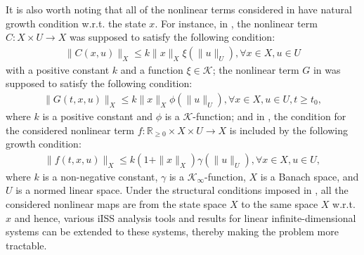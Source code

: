 \documentclass[onecolumn]{autart}
\newenvironment{proof of Prop.ODE}{{\it Proof of Proposition~\ref{Prop.ODE}:\enspace}}{\hfill $\blacksquare$\par}
\newenvironment{proof of PDE}{{\it Proof of Proposition \ref{Prop.8}:\enspace}}{\hfill $\blacksquare$\par}
\begin{document}
It is also worth noting that  all of  the nonlinear terms considered in {\cite{mironchenko2016MCRF,mironchenko2020SIAM,Hosfeld2022,damak2021input,damak2023input,Heni:2025,JoseL2023}} have    natural growth condition  { w.r.t. } the state $x$. For instance, in \cite{mironchenko2016MCRF}, the nonlinear term $C: X \times U \to X$ was supposed to satisfy the following condition:
\begin{align*}
	\|C(x, u)\|_X \leq k\|x\|_X   \xi(\|u\|_U),   \forall x \in X, u \in U
\end{align*}
with a positive constant $k$ and a function $\xi \in \mathcal{K}$;   the nonlinear term $G$ in {\cite{damak2021input,Heni:2025}} was supposed to satisfy the following condition:
\begin{align*}
	{\|G(t,x,u)\|_X}\leq k \|x\|_X \phi(\|u\|_U),{\forall x\in X,u\in U,t\geq t_0,}
\end{align*}
where $k$ is a positive constant and $\phi$ is a  {$\mathcal{K}$-function}; and in \cite{JoseL2023},   the condition for the considered nonlinear term $f:\mathbb{R}_{\geq 0}\times X \times U \rightarrow X$   is included by the following    growth condition:
\begin{align*}
	\|f(t,x,u)\|_{{X}}\leq k(1+  \|x\|_{{X}} )\gamma(\|u\|_U),\forall x\in X, u\in U,
\end{align*}
where $k$ is a non-negative constant,  $\gamma$ is a  {$\mathcal{K}_\infty$-function}, $X$ is a Banach space, and $U$ is a  normed linear space.  Under the structural conditions imposed in {\cite{mironchenko2016MCRF,mironchenko2020SIAM,Hosfeld2022,damak2021input,damak2023input,Heni:2025,JoseL2023}},     all the considered nonlinear   maps are from the state space $X$ to the same space $X$ w.r.t. $ x$  and hence, various iISS analysis tools and results   for  linear   infinite-dimensional  systems  can be extended to  these systems, thereby making the problem more tractable.
\end{document}
